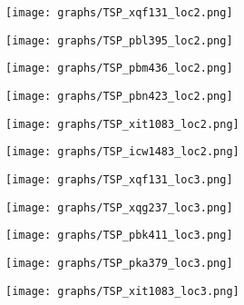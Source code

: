\documentclass{article}
\def\v{0.4}
\begin{document}
	\begin{figure}[h!]
		\centering
		\begin{subfigure}[b]{\v\linewidth}
			\texttt{[image: graphs/TSP\_xqf131\_loc2.png]}
		\end{subfigure}
		\begin{subfigure}[b]{\v\linewidth}
			\texttt{[image: graphs/TSP\_pbl395\_loc2.png]}
		\end{subfigure}
		\begin{subfigure}[b]{\v\linewidth}
			\texttt{[image: graphs/TSP\_pbm436\_loc2.png]}
		\end{subfigure}
		\begin{subfigure}[b]{\v\linewidth}
			\texttt{[image: graphs/TSP\_pbn423\_loc2.png]}
		\end{subfigure}
		\begin{subfigure}[b]{\v\linewidth}
			\texttt{[image: graphs/TSP\_xit1083\_loc2.png]}
		\end{subfigure}
		\begin{subfigure}[b]{\v\linewidth}
			\texttt{[image: graphs/TSP\_icw1483\_loc2.png]}
		\end{subfigure}
	\end{figure}

	\begin{figure}[h!]
		\centering
		\begin{subfigure}[b]{\v\linewidth}
			\texttt{[image: graphs/TSP\_xqf131\_loc3.png]}
		\end{subfigure}
		\begin{subfigure}[b]{\v\linewidth}
			\texttt{[image: graphs/TSP\_xqg237\_loc3.png]}
		\end{subfigure}
		\begin{subfigure}[b]{\v\linewidth}
			\texttt{[image: graphs/TSP\_pbk411\_loc3.png]}
		\end{subfigure}
		\begin{subfigure}[b]{\v\linewidth}
			\texttt{[image: graphs/TSP\_pka379\_loc3.png]}
		\end{subfigure}
		\begin{subfigure}[b]{\v\linewidth}
			\texttt{[image: graphs/TSP\_xit1083\_loc3.png]}
		\end{subfigure}
	\end{figure}
\end{document}
